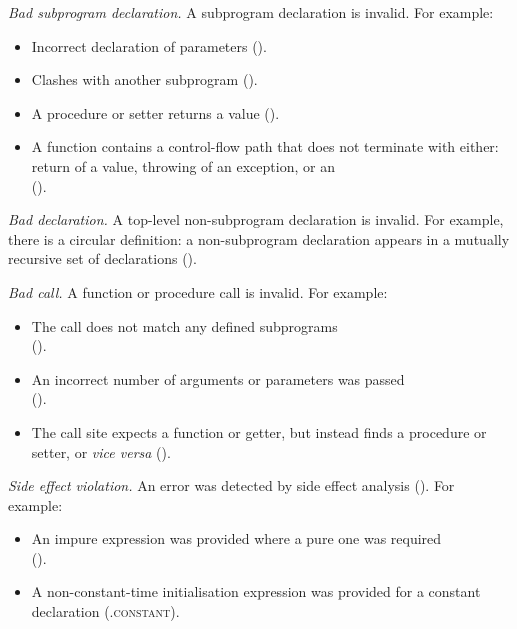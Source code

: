 \begin{description}
\hypertarget{def-badsubprogramdeclaration}{}
\item[$\BadSubprogramDeclaration$]
  \textit{Bad subprogram declaration.}
  A subprogram declaration is invalid.
  For example:
  \begin{itemize}
    \item Incorrect declaration of parameters ().
    \item Clashes with another subprogram ().
    \item A procedure or setter returns a value ().
    \item A function contains a control-flow path that does not terminate with either:
          return of a value, throwing of an exception, or an \unreachablestatementterm{} \\
      ().
  \end{itemize}

\hypertarget{def-baddeclaration}{}
\item[$\BadDeclaration$]
  \textit{Bad declaration.}
  A top-level non-subprogram declaration is invalid.
  For example, there is a circular definition: a non-subprogram declaration appears in a mutually recursive set of declarations ().

\hypertarget{def-badcall}{}
\item[$\BadCall$]
  \textit{Bad call.}
  A function or procedure call is invalid.
  For example:
  \begin{itemize}
    \item The call does not match any defined subprograms \\
          ().
    \item An incorrect number of arguments or parameters was passed \\
      ().
    \item The call site expects a function or getter, but instead finds a procedure or setter, or \textit{vice versa} ().
  \end{itemize}

\hypertarget{def-sideeffectviolation}{}
\item[$\SideEffectViolation$]
  \textit{Side effect violation.}
  An error was detected by side effect analysis ().
  For example:
  \begin{itemize}
    \item An impure expression was provided where a pure one was required \\
      ().
    \item A non-constant-time initialisation expression was provided for a constant declaration (.\textsc{constant}).
  \end{itemize}


\end{description}
